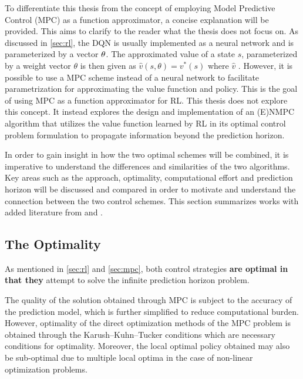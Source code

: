 To differentiate this thesis from the concept of employing Model Predictive Control (MPC) as a function approximator, a concise explanation will be provided. This aims to clarify to the reader what the thesis does not focus on. As discussed in \autoref{sec:rl}, the DQN is usually implemented as a neural network and is parameterized by a vector $\bold{\theta}$. The approximated value of a state $s$, parameterized by a weight vector  $\theta$ is then given as $ \hat{v}(s,\theta) = v^*(s)$ where $\hat{v}$ \cite{lubbersAutonomousGreenhouseClimate2023}. However, it is possible to use a MPC scheme instead of a neural network to facilitate parametrization for approximating the value function and policy. This is the goal of using MPC as a function approximator for RL. This thesis does not explore this concept. It instead explores the design and implementation of an (E)NMPC algorithm that utilizes the value function learned by RL in its optimal control problem formulation to propagate information beyond the prediction horizon. 

In order to gain insight in how the two optimal schemes will be combined, it is imperative to understand the differences and similarities of the two algorithms. Key areas such as the approach, optimality, computational effort and prediction horizon will be discussed and compared in order to motivate and understand the connection between the two control schemes. This section summarizes \cite{arroyoReinforcedModelPredictive2022} works with added literature from \cite{bertsekasNewtonMethodReinforcement2022} and \cite{linReinforcementLearningBasedModel2023}.

\subsection{The Optimality}
 As mentioned in \autoref{sec:rl} and \autoref{sec:mpc}, both control strategies \textbf{are optimal in that they} attempt to solve the infinite prediction horizon problem.

The quality of the solution obtained through MPC is subject to the accuracy of the prediction model, which is further simplified to reduce computational burden. However, optimality of the direct optimization methods of the MPC problem is obtained through the Karush–Kuhn–Tucker conditions which are necessary conditions for optimality. Moreover, the local optimal policy obtained may also be sub-optimal due to multiple local optima in the case of non-linear optimization problems.

